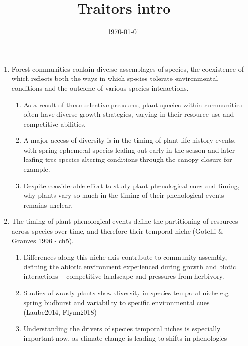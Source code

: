 \documentclass{article}
\begin{document}
\title{Traitors intro}
\date{\today}

\maketitle 

\begin{enumerate}

\item Forest communities contain diverse assemblages of species, the coexistence of which reflects both the ways in which species tolerate environmental conditions and the outcome of various species interactions. 

\begin{enumerate}
\item As a result of these selective pressures, plant species within communities often have diverse growth strategies, varying in their resource use and competitive abilities. 
\item  A major access of diversity is in the timing of plant life history events, with spring ephemeral species leafing out early in the season and later leafing tree species altering conditions through the canopy closure for example.
\item Despite considerable effort to study plant phenological cues and timing, why plants vary so much in the timing of their phenological events remains unclear.
\end{enumerate}

\item The timing of plant phenological events define the partitioning of resources across species over time, and therefore their temporal niche (Gotelli \& Granves 1996 - ch5).
\begin{enumerate}
\item Differences along this niche axis contribute to community assembly, defining the abiotic environment experienced during growth and biotic interactions -- competitive landscape and pressures from herbivory.
\item Studies of woody plants show diversity in species temporal niche e.g spring budburst and variability to specific environmental cues (Laube2014, Flynn2018)
\item Understanding the drivers of species temporal niches is especially important now, as climate change is leading to shifts in phenologies
\end{enumerate}


\end{enumerate}
\end{document}
